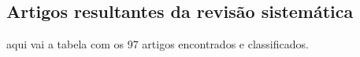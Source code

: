 \documentclass[
article,			%
11pt,				%
oneside,			%
a4paper,			%
english,			%
brazil,				%
sumario=tradicional
]{abntex2}
\begin{document}

  
  \begin{anexosenv}

    \chapter{Artigos resultantes da revisão sistemática}
    aqui vai a tabela com os 97 artigos encontrados e classificados.

  \end{anexosenv}
\end{document}

